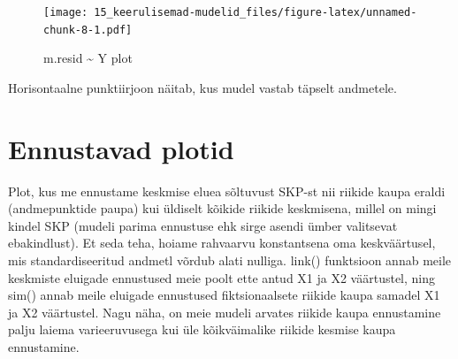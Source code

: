 \documentclass[]{book}
\newenvironment{Shaded}{\begin{snugshade}}{\end{snugshade}}
\newcommand{\KeywordTok}[1]{\textcolor[rgb]{0.13,0.29,0.53}{\textbf{#1}}}
\newcommand{\DataTypeTok}[1]{\textcolor[rgb]{0.13,0.29,0.53}{#1}}
\newcommand{\DecValTok}[1]{\textcolor[rgb]{0.00,0.00,0.81}{#1}}
\newcommand{\StringTok}[1]{\textcolor[rgb]{0.31,0.60,0.02}{#1}}
\newcommand{\OtherTok}[1]{\textcolor[rgb]{0.56,0.35,0.01}{#1}}
\newcommand{\OperatorTok}[1]{\textcolor[rgb]{0.81,0.36,0.00}{\textbf{#1}}}
\newcommand{\NormalTok}[1]{#1}
\begin{document}
\begin{Shaded}
\end{Shaded}

\begin{figure}
\centering
\texttt{[image: 15\_keerulisemad-mudelid\_files/figure-latex/unnamed-chunk-8-1.pdf]}
\caption{\label{fig:unnamed-chunk-8}m.resid \textasciitilde{} Y plot}
\end{figure}

Horisontaalne punktiirjoon näitab, kus mudel vastab täpselt andmetele.

\section*{Ennustavad plotid}\label{ennustavad-plotid}

Plot, kus me ennustame keskmise eluea sõltuvust SKP-st nii riikide kaupa
eraldi (andmepunktide paupa) kui üldiselt kõikide riikide keskmisena,
millel on mingi kindel SKP (mudeli parima ennustuse ehk sirge asendi
ümber valitsevat ebakindlust). Et seda teha, hoiame rahvaarvu
konstantsena oma keskväärtusel, mis standardiseeritud andmetl võrdub
alati nulliga. link() funktsioon annab meile keskmiste eluigade
ennustused meie poolt ette antud X1 ja X2 väärtustel, ning sim() annab
meile eluigade ennustused fiktsionaalsete riikide kaupa samadel X1 ja X2
väärtustel. Nagu näha, on meie mudeli arvates riikide kaupa ennustamine
palju laiema varieeruvusega kui üle kõikväimalike riikide kesmise kaupa
ennustamine.
\end{document}
